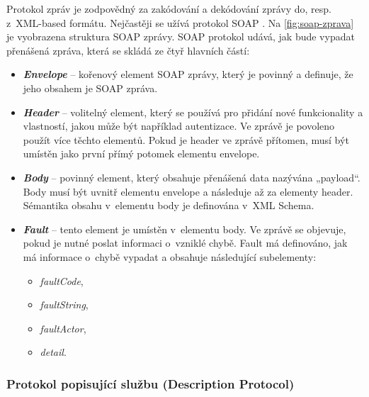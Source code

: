 \documentclass[11pt,twoside,a4paper]{book}
\begin{document}
Protokol zpráv je zodpovědný za zakódování a dekódování zprávy do, resp.
z~XML-based formátu. Nejčastěji se užívá protokol
SOAP \cite{OraSOAP} \cite{WikiSOAP}. Na \ref{fig:soap-zprava} je vyobrazena
struktura SOAP zprávy. SOAP protokol udává, jak bude vypadat přenášená zpráva,
která se skládá ze čtyř hlavních částí:

\begin{itemize}
\item \textbf{\textit{Envelope}} – kořenový element SOAP zprávy, který je povinný a definuje, že jeho
obsahem je SOAP zpráva.

\item \textbf{\textit{Header}} – volitelný element, který se používá pro přidání
nové funkcionality a vlastností, jakou může být například autentizace. Ve zprávě je povoleno použít více
těchto elementů. Pokud je header ve zprávě přítomen, musí být umístěn jako první
přímý potomek elementu envelope.
 
\item \textbf{\textit{Body}} – povinný element, který obsahuje přenášená
data nazývána „payload“. Body musí být uvnitř elementu envelope a následuje až
za elementy header. Sémantika obsahu v~elementu body je definována v~XML Schema.

\item \textbf{\textit{Fault}} – tento element je umístěn v~elementu body.
Ve zprávě se objevuje, pokud je nutné poslat informaci o~vzniklé chybě. Fault má definováno, jak má informace
o~chybě vypadat a obsahuje následující subelementy:

\begin{itemize}
  \item \textit{faultCode},
  \item \textit{faultString},
  \item \textit{faultActor},
  \item \textit{detail}.
\end{itemize}
\end{itemize}

\subsubsection{Protokol popisující službu (Description Protocol)}
\end{document}
